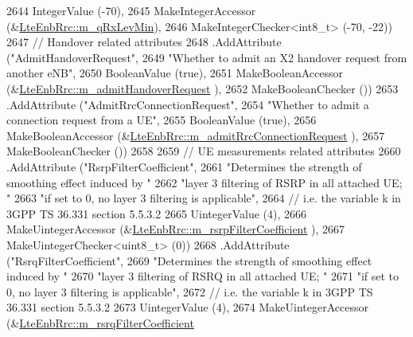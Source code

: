 \begin{DoxyCode}
2644                    IntegerValue (-70),
2645                    MakeIntegerAccessor (&\hyperlink{classns3_1_1LteEnbRrc_a17165cd0183013d03b55fead640067d8}{LteEnbRrc::m\_qRxLevMin}),
2646                    MakeIntegerChecker<int8\_t> (-70, -22))
2647     \textcolor{comment}{// Handover related attributes}
2648     .AddAttribute (\textcolor{stringliteral}{"AdmitHandoverRequest"},
2649                    \textcolor{stringliteral}{"Whether to admit an X2 handover request from another eNB"},
2650                    BooleanValue (\textcolor{keyword}{true}),
2651                    MakeBooleanAccessor (&\hyperlink{classns3_1_1LteEnbRrc_a727e2ef6a1438fce36c1d6236180364b}{LteEnbRrc::m\_admitHandoverRequest}
      ),
2652                    MakeBooleanChecker ())
2653     .AddAttribute (\textcolor{stringliteral}{"AdmitRrcConnectionRequest"},
2654                    \textcolor{stringliteral}{"Whether to admit a connection request from a UE"},
2655                    BooleanValue (\textcolor{keyword}{true}),
2656                    MakeBooleanAccessor (&\hyperlink{classns3_1_1LteEnbRrc_abe8ea555ca7235035d4fd13b35d12bd5}{LteEnbRrc::m\_admitRrcConnectionRequest}
      ),
2657                    MakeBooleanChecker ())
2658 
2659     \textcolor{comment}{// UE measurements related attributes}
2660     .AddAttribute (\textcolor{stringliteral}{"RsrpFilterCoefficient"},
2661                    \textcolor{stringliteral}{"Determines the strength of smoothing effect induced by "}
2662                    \textcolor{stringliteral}{"layer 3 filtering of RSRP in all attached UE; "}
2663                    \textcolor{stringliteral}{"if set to 0, no layer 3 filtering is applicable"},
2664                    \textcolor{comment}{// i.e. the variable k in 3GPP TS 36.331 section 5.5.3.2}
2665                    UintegerValue (4),
2666                    MakeUintegerAccessor (&\hyperlink{classns3_1_1LteEnbRrc_ab5d107b13d8042f862008b8d440fe3a6}{LteEnbRrc::m\_rsrpFilterCoefficient}
      ),
2667                    MakeUintegerChecker<uint8\_t> (0))
2668     .AddAttribute (\textcolor{stringliteral}{"RsrqFilterCoefficient"},
2669                    \textcolor{stringliteral}{"Determines the strength of smoothing effect induced by "}
2670                    \textcolor{stringliteral}{"layer 3 filtering of RSRQ in all attached UE; "}
2671                    \textcolor{stringliteral}{"if set to 0, no layer 3 filtering is applicable"},
2672                    \textcolor{comment}{// i.e. the variable k in 3GPP TS 36.331 section 5.5.3.2}
2673                    UintegerValue (4),
2674                    MakeUintegerAccessor (&\hyperlink{classns3_1_1LteEnbRrc_a505a1db46c8f5b6abe174a536485c44d}{LteEnbRrc::m\_rsrqFilterCoefficient}

\end{DoxyCode}
